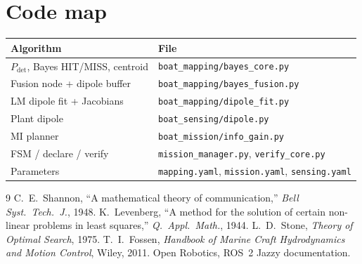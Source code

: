 \documentclass[11pt,a4paper]{article}
\begin{document}
\section{Code map}
\begin{center}
\begin{tabular}{@{}ll@{}}
\toprule
Algorithm & File \\
\midrule
\(P_{\mathrm{det}}\), Bayes HIT/MISS, centroid & \texttt{boat\_mapping/bayes\_core.py} \\
Fusion node + dipole buffer & \texttt{boat\_mapping/bayes\_fusion.py} \\
LM dipole fit + Jacobians & \texttt{boat\_mapping/dipole\_fit.py} \\
Plant dipole & \texttt{boat\_sensing/dipole.py} \\
MI planner & \texttt{boat\_mission/info\_gain.py} \\
FSM / declare / verify & \texttt{mission\_manager.py}, \texttt{verify\_core.py} \\
Parameters & \texttt{mapping.yaml}, \texttt{mission.yaml}, \texttt{sensing.yaml} \\
\bottomrule
\end{tabular}
\end{center}

\begin{thebibliography}{9}
 C.~E.~Shannon, ``A mathematical theory of communication,''
\emph{Bell Syst.\ Tech.\ J.}, 1948.
 K.~Levenberg, ``A method for the solution of certain non-linear
problems in least squares,'' \emph{Q.\ Appl.\ Math.}, 1944.
 L.~D.~Stone, \emph{Theory of Optimal Search}, 1975.
 T.~I.~Fossen, \emph{Handbook of Marine Craft Hydrodynamics and
Motion Control}, Wiley, 2011.
 Open Robotics, ROS~2 Jazzy documentation.
\end{thebibliography}
\end{document}
